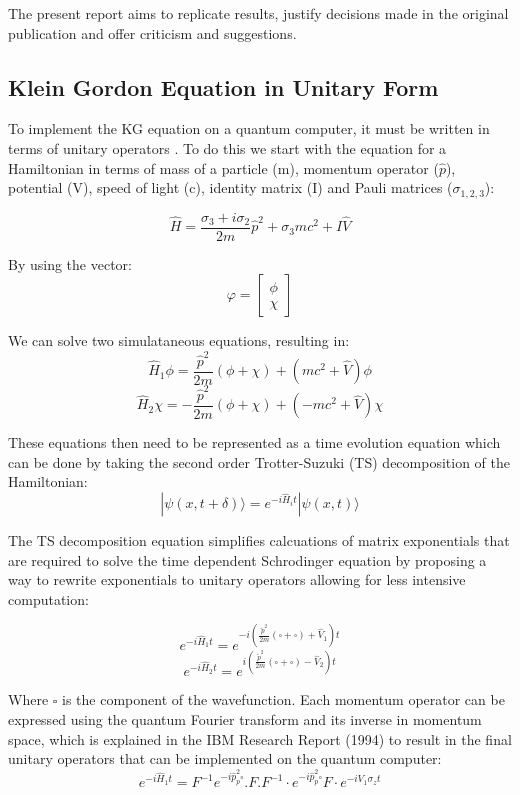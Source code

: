 \documentclass{article}
\begin{document}
The present report aims to replicate results, justify decisions made in the original publication and offer criticism and suggestions. 

\subsection{Klein Gordon Equation in Unitary Form}
To implement the KG equation on a quantum computer, it must be written in terms of unitary operators \cite{manik}. To do this we start with the equation for a Hamiltonian in terms of mass of a particle (m), momentum operator ($\hat{p}$), potential (V), speed of light (c), identity matrix (I) and Pauli matrices ($\sigma_{1,2,3}$):

\begin{equation}
\hat{H}=\frac{\sigma_{3}+i \sigma_{2}}{2 m} \hat{p}^{2}+\sigma_{3} m c^{2}+I \hat{V}
\end{equation}

\noindent By using the vector: 
\[\varphi=\left[\begin{array}{l}{\phi} \\ {\chi}\end{array}\right]\]

\noindent We can solve two simulataneous equations, resulting in:
\[\hat{H}_{1} \phi=\frac{\hat{p}^2}{2m}(\phi+\chi)+(mc^2+\hat{V}) \phi\]
\[\hat{H}_{2} \chi=-\frac{\hat{p}^2}{2m}(\phi+\chi)+(-mc^2+\hat{V}) \chi\]

\noindent These equations then need to be represented as a time evolution equation which can be done by taking the second order Trotter-Suzuki (TS) decomposition \cite{trotter} of the Hamiltonian:
\[|\psi(x, t+\delta)\rangle= e^{-i \hat{H}_{i} t}|\psi(x, t)\rangle\]

The TS decomposition equation simplifies calcuations of matrix exponentials that are required to solve the time dependent Schrodinger equation by proposing a way to rewrite exponentials to unitary operators allowing for less intensive computation:

\[e^{-i \hat{H}_{1} t}=e^{-i\left(\frac{\tilde{p}^{2}}{2 m}(\square+\square)+\hat{V}_{1}\right) t}\]
\[e^{-i \hat{H}_{2} t}=e^{i\left(\frac{\tilde{p}^{2}}{2 m}(\square+\square)-\hat{V}_{2}\right) t}\]

Where $\square$ is the component of the wavefunction. Each momentum operator can be expressed using the quantum Fourier transform and its inverse in momentum space, which is explained in the IBM Research Report (1994) \cite{ibm} to result in the final unitary operators that can be implemented on the quantum computer:
\begin{equation}
e^{-i \hat{H}_{1} t}=F^{-1} e^{-i \hat{p}_{p}^{2} \square} . F . F^{-1} \cdot e^{-i \hat{p}_{p}^{2} \square} F \cdot e^{-i V_{1} \sigma_{z} t}
\end{equation}
\end{document}
